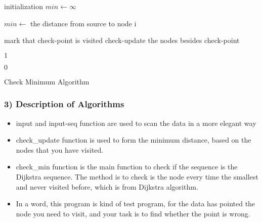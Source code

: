 \documentclass{article}
\begin{document}
\begin{algorithm}[H]
    \SetAlgoLined

    initialization\;
    {$min\leftarrow \infty$}

    {
        {
            {$min\leftarrow$ the distance from source to node i}
        }
    }
    {
        mark that check-point is visited
        check-update the nodes besides check-point

        \Return $1$
    }
    \Return $0$
    \caption{Check Minimum Algorithm}
\end{algorithm}

\subsubsection*{3) Description of Algorithms}

\begin{itemize}
    \item input and input-seq function are used to scan the data in a more elegant way
    \item check\_update function is used to form the minimum distance, based on the nodes that you have visited.
    \item check\_min function is the main function to check if the sequence is the Dijkstra sequence. The method is to check is the node every time the smallest and never visited before, which is from Dijkstra algorithm.
    \item In a word, this program is kind of test program, for the data has pointed the node you need to visit, and your task is to find whether the point is wrong.

\end{itemize}
\end{document}
